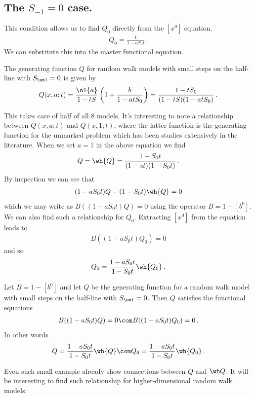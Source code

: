 \subsection{The $S_{-1} = 0$ case.}
This condition allows us to find $Q_0$ directly from the $[x^0]$ equation.
\begin{align}
	Q_0 = \frac{1}{1-aS_0t}\,.
\end{align}
We can substitute this into the master functional equation.
\begin{prop} The generating function $Q$ for random walk models with small steps on the half-line with $S_{\um 1} = 0$ is given by
\begin{align}
	Q(x,a;t) =\frac{\ol{a}}{1-tS}\left(1 + \frac{b}{{1-atS_0}}\right) = \frac{1-tS_0}{(1-tS)(1-atS_0)}\,.
\end{align}
\end{prop}
This takes care of half of all 8 models. It's interesting to note a relationship between $Q(x,a;t)$ and $Q(x,1;t)$, where the latter function is the generating function for the unmarked problem which has been studies extensively in the literature. When we set $a = 1$ in the above equation we find
\begin{align}
	[b^0]Q = \wh{Q} =  \frac{1-S_0t}{(1-st)(1-S_0t)}\,.
\end{align}
By inspection we can see that
\begin{align}
	(1-aS_0t)Q-(1-S_0t)\wh{Q} = 0
\end{align}
which we may write as $B((1-aS_0t)Q)  = 0$ using the operator $B = 1- [b^0]$. We can also find such a relationship for $Q_0$. Extracting $[x^0]$ from the equation leads to
\begin{align}
	B((1-aS_0t)Q_0) = 0
\end{align}
and so
\begin{align}
	Q_0 = \frac{1-aS_0t}{1-S_0t}\wh{Q_0}\,.
\end{align}
\begin{prop} Let $B = 1 - [b^0]$ and let $Q$ be the generating function for a random walk model with small steps on the half-line with $S_{\um 1} = 0$. Then $Q$ satisfies the functional equations
\begin{align}
	B((1-aS_0t)Q) = 0\com B((1-aS_0t)Q_0) = 0\,.
\end{align}
In other words
\begin{align}
	Q = \frac{1-aS_0t}{1-S_0t}\wh{Q}\com Q_0 = \frac{1-aS_0t}{1-S_0t}\wh{Q_0}\,.
\end{align}
\end{prop}
Even such small example already show connections between $Q$ and $\wh Q$. It will be interesting to find such relationship for higher-dimensional random walk models.
